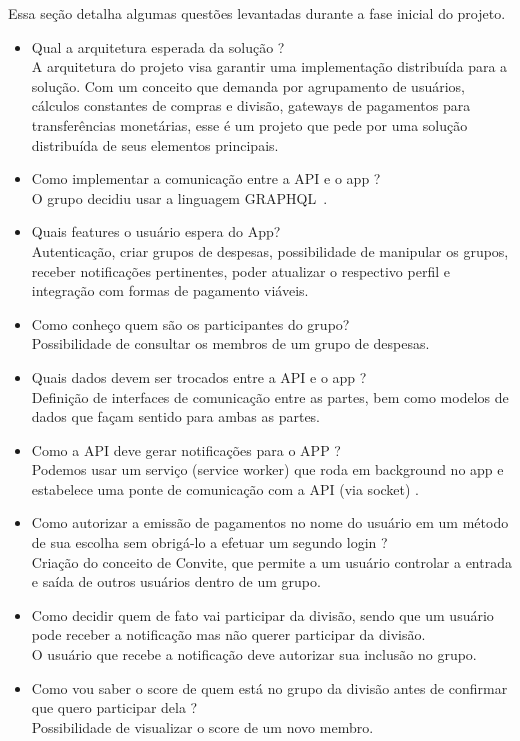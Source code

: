 Essa seção detalha algumas questões levantadas durante a fase inicial do projeto.

\begin{itemize}
    \item Qual a arquitetura esperada da solução ?\\
    A arquitetura do projeto visa garantir uma implementação distribuída para a solução. Com um conceito que demanda por agrupamento de usuários, cálculos constantes de compras e divisão, gateways de pagamentos para transferências monetárias, esse é um projeto que pede por uma solução distribuída de seus elementos principais.
    
    \item Como implementar a comunicação entre a API e o app ?\\
O grupo decidiu usar a linguagem GRAPHQL~\cite{graphql}.

\item Quais features o usuário espera do App?\\
Autenticação, criar grupos de despesas, possibilidade de manipular os grupos, receber notificações pertinentes, poder atualizar o respectivo perfil e integração com formas de pagamento viáveis.

\item Como conheço quem são os participantes do grupo?\\
Possibilidade de consultar os membros de um grupo de despesas.

\item Quais dados devem ser trocados entre a API e o app ?\\
 Definição de interfaces de comunicação entre as partes, bem como modelos de dados que façam sentido para ambas as partes.

\item Como a API deve gerar notificações para o APP ?\\
Podemos usar um serviço (service worker) que roda em background no app e estabelece uma ponte de comunicação com a API (via socket) .

\item Como autorizar a emissão de pagamentos no nome do usuário em um método de sua escolha sem obrigá-lo a efetuar um segundo login ?\\
Criação do conceito de Convite, que permite a um usuário controlar a entrada e saída de outros usuários dentro de um grupo.

\item Como decidir quem de fato vai participar da divisão, sendo que um usuário pode receber a notificação mas não querer participar da divisão.\\
O usuário que recebe a notificação deve autorizar sua inclusão no grupo.

\item Como vou saber o score de quem está no grupo da divisão antes de confirmar que quero participar dela ?\\
Possibilidade de visualizar o score de um novo membro.

\end{itemize}